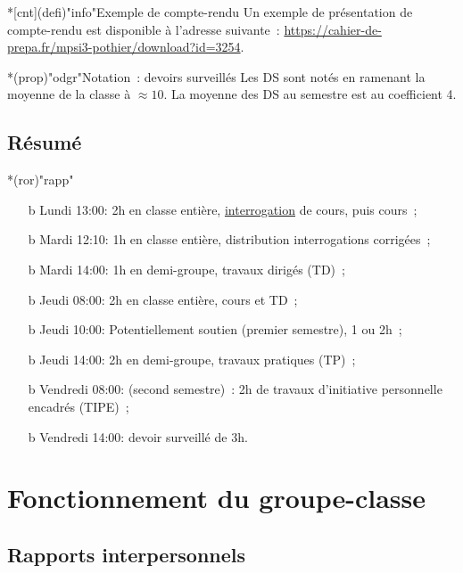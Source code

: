 \documentclass[a4paper, 10pt, garamond]{book}
\begin{document}
\begin{tcn}*[cnt](defi)"info"{Exemple de compte-rendu}
	Un exemple de présentation de compte-rendu est disponible à l'adresse
	suivante~: \url{https://cahier-de-prepa.fr/mpsi3-pothier/download?id=3254}.
\end{tcn}

\begin{tcn}*(prop)"odgr"{Notation~: devoirs surveillés}
	Les DS sont notés en ramenant la moyenne de la classe à $\approx 10$. La
	moyenne des DS au semestre est au coefficient 4.
\end{tcn}

\subsection{Résumé}
\begin{tcn}*(ror)"rapp"{}
	\begin{itemize}
		\item[b]{Lundi 13\string:00}: 2h en classe entière, \ul{interrogation} de
		cours, puis cours~;
		\item[b]{Mardi 12\string:10}: 1h en classe entière, distribution
		interrogations corrigées~;
		\item[b]{Mardi 14\string:00}: 1h en demi-groupe, travaux dirigés (TD)~;
		\item[b]{Jeudi 08\string:00}: 2h en classe entière, cours et TD~;
		\item[b]{Jeudi 10\string:00}: Potentiellement soutien (premier semestre), 1
		ou 2h~;
		\item[b]{Jeudi 14\string:00}: 2h en demi-groupe, travaux pratiques (TP)~;
		\item[b]{Vendredi 08\string:00}: (second semestre)~: 2h de travaux
		d'initiative personnelle encadrés (TIPE)~;
		\item[b]{Vendredi 14\string:00}: devoir surveillé de 3h.
	\end{itemize}
\end{tcn}

\section{Fonctionnement du groupe-classe}
\subsection{Rapports interpersonnels}

\end{document}
